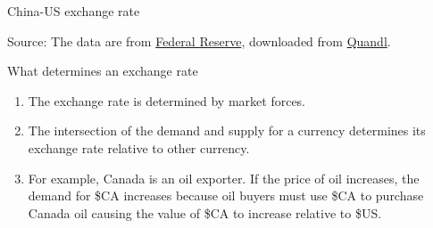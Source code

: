 \documentclass[table,xcolor=pdftex,dvipsnames]{beamer}\usepackage[]{graphicx}\usepackage[]{color}
\makeatletter
\newenvironment{kframe}{%
 \def\at@end@of@kframe{}%
 \ifinner\ifhmode%
  \def\at@end@of@kframe{\end{minipage}}%
  \begin{minipage}{\columnwidth}%
 \fi\fi%
 \def\FrameCommand##1{\hskip\@totalleftmargin \hskip-\fboxsep
 \colorbox{shadecolor}{##1}\hskip-\fboxsep
     \hskip-\linewidth \hskip-\@totalleftmargin \hskip\columnwidth}%
 \MakeFramed {\advance\hsize-\width
   \@totalleftmargin\z@ \linewidth\hsize
   \@setminipage}}%
 {\par\unskip\endMakeFramed%
 \at@end@of@kframe}
\newenvironment{knitrout}{}{} %
\makeatother
\begin{document}
\begin{frame}{China-US exchange rate}
\begin{knitrout}
\color{fgcolor}\begin{kframe}


{\ttfamily\noindent\bfseries\color{errorcolor}{\#\# Error in print(Chinaexchangerate): object 'Chinaexchangerate' not found}}\end{kframe}
\end{knitrout}
\scriptsize
Source: The data are from \href{http://www.federalreserve.gov/econresdata/default.htm}{Federal Reserve}, downloaded from \href{http://www.quandl.com/}{Quandl}.
\end{frame}



\begin{frame}{What determines an exchange rate}
\begin{enumerate}[label=\textbullet]
    \item The exchange rate is determined by market forces.
    \item The intersection of the demand and supply for a currency determines its exchange rate relative to other currency.
    \item For example, Canada is an oil exporter. If the price of oil increases, the demand for \$CA increases because oil buyers must use \$CA to purchase Canada oil causing the value of \$CA to increase relative to \$US.
\end{enumerate}
\end{frame}

\end{document}
